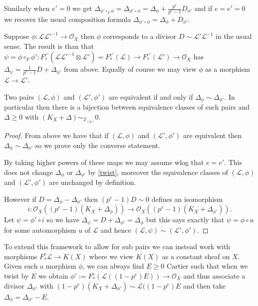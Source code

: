 \documentclass[a4paper,12pt]{book}
\newcommand{\Fe}{F^{e}_{*}}
\newcommand{\ox}[1][X]{\mathcal{O}_{#1}}
\newcommand{\zp}{\mathbb{Z}_{(p)}}
\begin{document}
Similarly when $e'=0$ we get $\Delta_{\phi' \circ_{F} \phi}=\Delta_{\phi' \circ \phi}=\Delta_{\phi} + \frac{p^{e}}{p^{e}-1}D_{\phi'}$ and if $e=e'=0$ we recover the usual composition formula $\Delta_{\phi' \circ \phi}=\Delta_{\phi} + D_{\phi'}$.

Suppose $\phi: \mathcal{L}\mathcal{L'}^{-1} \to \ox$ then $\phi$ corresponds to a divisor $D\sim \mathcal{L'}\mathcal{L}^{-1}$ in the usual sense. The result is than that $\psi=\phi \circ_{F} \phi': F_{*}^{e'}(\mathcal{L}\mathcal{L'}^{-1} \otimes \mathcal{L'})=F_{*}^{e'}(\mathcal{L}) \to F_{*}^{e'}(\mathcal{L'})\to\ox$ has $\Delta_{\psi}=\frac{1}{p^{e}-1}D+\Delta_{\phi'}$ from above. Equally of course we may view $\phi$ as a morphism $\mathcal{L} \to \mathcal{L'}$. 

\begin{lemma}
	
	Two pairs $(\mathcal{L}, \phi)$ and $(\mathcal{L}', \phi')$ are equivalent if and only if $\Delta_{\phi}\sim \Delta_{\phi'}$. In particular then there is a bijection between equivalence classes of such pairs and $\Delta \geq 0$ with $(K_{X}+\Delta)\sim_{\zp} 0$.
	
	
	\end{lemma}

\begin{proof}
	
	From above we have that if $(\mathcal{L}, \phi)$ and $(\mathcal{L}', \phi')$ are equivalent then $\Delta_{\phi}\sim \Delta_{\phi'}$ so we prove only the converse statement.
	
	By taking higher powers of these maps we may assume wlog that $e=e'$. This does not change $\Delta_{\phi}$ or $\Delta_{\phi'}$ by \autoref{twist}, moreover the equivalence classes of $(\mathcal{L}, \phi)$ and $(\mathcal{L}', \phi')$ are unchanged by definition.
	
	However if $D=\Delta_{\phi}-\Delta_{\phi'}$ then $(p^{e}-1)D \sim 0$ defines an isomorphism $$i:\ox((p^{e}-1)(K_{X}+\Delta_{\phi}))\to \ox ((p^{e}-1)(K_{X}+\Delta_{\phi'})).$$ Let $\psi=\phi' \circ i$ so we have $\Delta_{\psi}=D+\Delta_{\phi'}=\Delta_{\phi}$ but this says exactly that $\psi=\phi\circ u$ for some automorphism $u$ of $\mathcal{L}$ and hence $(\mathcal{L},\psi)\sim(\mathcal{L'},\phi')$. 
	
\end{proof}

To extend this framework to allow for sub pairs we can instead work with morphisms $\Fe\mathcal{L} \to K(X)$ where we view $K(X)$ as a constant sheaf on $X$. Given such a morphism $\phi$, we can always find $E \geq 0$ Cartier such that when we twist by $E$ we obtain $\phi':=\Fe(\mathcal{L}((1-p^{e})E)) \to \ox$ and thus associate a divisor $\Delta_{\phi'}$ with $(1-p^{e})(K_{X}+\Delta_{\phi'})\sim \mathcal{L}((1-p^{e})E$ and then take $\Delta_{\phi}=\Delta_{\phi'}-E$.
\end{document}
